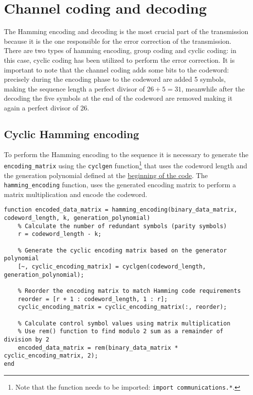 \vspace{40px} \section{Channel coding and decoding}
The Hamming encoding and decoding is the most crucial part of the transmission because it is the one responsible for the error correction of the transmission. There are two types of hamming encoding, group coding and cyclic coding: in this case, cyclic coding has been utilized to perform the error correction. It is important to note that the channel coding adds some bits to the codeword: precisely during the encoding phase to the codeword are added 5 symbols, making the sequence length a perfect divisor of $26 + 5 = 31$, meanwhile after the decoding the five symbols at the end of the codeword are removed making it again a perfect divisor of 26.   




\subsection{Cyclic Hamming encoding}
To perform the Hamming encoding to the sequence it is necessary to generate the \texttt{encoding\_matrix} using the \texttt{cyclgen} function\footnote{Note that the function needs to be imported: \texttt{import communications.*}.} that uses the codeword length and the generation polynomial defined at the \hyperref[initial-parameters]{beginning of the code}. The \texttt{hamming\_encoding} function, uses the generated encoding matrix to perform a matrix multiplication and encode the codeword.

\begin{lstlisting}
function encoded_data_matrix = hamming_encoding(binary_data_matrix, codeword_length, k, generation_polynomial)
    % Calculate the number of redundant symbols (parity symbols)
    r = codeword_length - k;
    
    % Generate the cyclic encoding matrix based on the generator polynomial
    [~, cyclic_encoding_matrix] = cyclgen(codeword_length, generation_polynomial);
    
    % Reorder the encoding matrix to match Hamming code requirements
    reorder = [r + 1 : codeword_length, 1 : r];
    cyclic_encoding_matrix = cyclic_encoding_matrix(:, reorder);
    
    % Calculate control symbol values using matrix multiplication
    % Use rem() function to find modulo 2 sum as a remainder of division by 2
    encoded_data_matrix = rem(binary_data_matrix * cyclic_encoding_matrix, 2);
end
\end{lstlisting}


